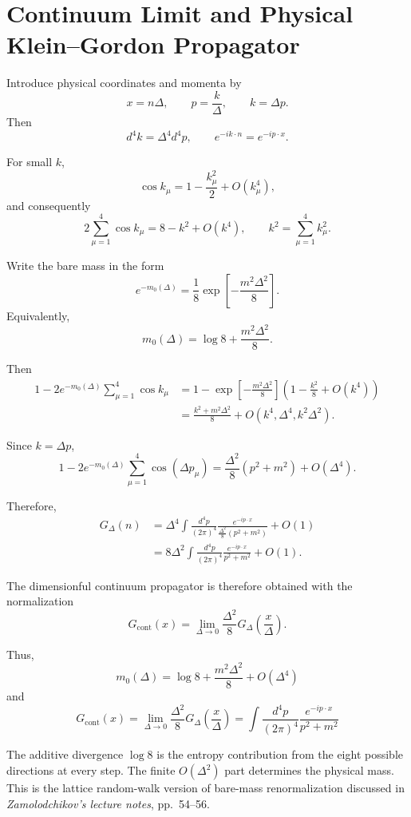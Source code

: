 \documentclass[11pt]{article}
\begin{document}
	\section{Continuum Limit and Physical Klein--Gordon Propagator}
	
	Introduce physical coordinates and momenta by
	\[
	x=n\Delta,
	\qquad
	p=\frac{k}{\Delta},
	\qquad
	k=\Delta p.
	\]
	Then
	\[
	d^4k=\Delta^4d^4p,
	\qquad
	e^{-ik\cdot n}=e^{-ip\cdot x}.
	\]
	
	For small $k$,
	\[
	\cos k_\mu
	=
	1-\frac{k_\mu^2}{2}+O(k_\mu^4),
	\]
	and consequently
	\[
	2\sum_{\mu=1}^{4}\cos k_\mu
	=
	8-k^2+O(k^4),
	\qquad
	k^2=\sum_{\mu=1}^{4}k_\mu^2.
	\]
	
	Write the bare mass in the form
	\[
	e^{-m_0(\Delta)}
	=
	\frac{1}{8}
	\exp\left[-\frac{m^2\Delta^2}{8}\right].
	\]
	Equivalently,
	\[
	m_0(\Delta)
	=
	\log8+\frac{m^2\Delta^2}{8}.
	\]
	
	Then
	\begin{align}
		1-2e^{-m_0(\Delta)}
		\sum_{\mu=1}^{4}\cos k_\mu
		&=
		1-
		\exp\left[-\frac{m^2\Delta^2}{8}\right]
		\left(1-\frac{k^2}{8}+O(k^4)\right)
		\nonumber\\
		&=
		\frac{k^2+m^2\Delta^2}{8}
		+O(k^4,\Delta^4,k^2\Delta^2).
	\end{align}
	
	Since $k=\Delta p$,
	\[
	1-2e^{-m_0(\Delta)}
	\sum_{\mu=1}^{4}\cos(\Delta p_\mu)
	=
	\frac{\Delta^2}{8}
	\left(p^2+m^2\right)
	+O(\Delta^4).
	\]
	
	Therefore,
	\begin{align}
		G_\Delta(n)
		&=
		\Delta^4
		\int\frac{d^4p}{(2\pi)^4}
		\frac{e^{-ip\cdot x}}
		{\frac{\Delta^2}{8}(p^2+m^2)}
		+O(1)
		\nonumber\\
		&=
		8\Delta^2
		\int\frac{d^4p}{(2\pi)^4}
		\frac{e^{-ip\cdot x}}{p^2+m^2}
		+O(1).
	\end{align}
	
	The dimensionful continuum propagator is therefore obtained with the
	normalization
	\[
	G_{\mathrm{cont}}(x)
	=
	\lim_{\Delta\to0}
	\frac{\Delta^2}{8}G_\Delta\left(\frac{x}{\Delta}\right).
	\]
	
	Thus,
	\[
	\boxed{
		m_0(\Delta)
		=
		\log 8+\frac{m^2\Delta^2}{8}
		+O(\Delta^4)
	}
	\]
	and
	\[
	\boxed{
		G_{\mathrm{cont}}(x)
		=
		\lim_{\Delta\to0}
		\frac{\Delta^2}{8}
		G_\Delta\left(\frac{x}{\Delta}\right)
		=
		\int\frac{d^4p}{(2\pi)^4}
		\frac{e^{-ip\cdot x}}{p^2+m^2}
	}
	\]
	
	The additive divergence $\log8$ is the entropy contribution from the
	eight possible directions at every step. The finite $O(\Delta^2)$
	part determines the physical mass. This is the lattice random-walk
	version of bare-mass renormalization discussed in
	\emph{Zamolodchikov’s lecture notes}, pp.~54--56.
	
\end{document}

